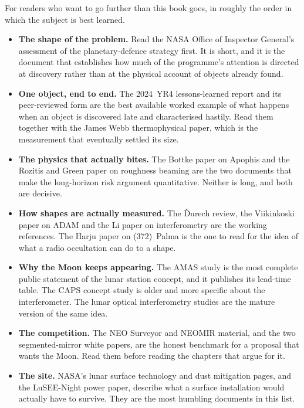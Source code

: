 \noindent\small
For readers who want to go further than this book goes, in roughly the order
in which the subject is best learned.

\begin{itemize}
\item \textbf{The shape of the problem.} Read the NASA Office of Inspector
General's assessment of the planetary-defence strategy first. It is short,
and it is the document that establishes how much of the programme's
attention is directed at discovery rather than at the physical account of
objects already found.
\item \textbf{One object, end to end.} The 2024~YR4 lessons-learned report
and its peer-reviewed form are the best available worked example of what
happens when an object is discovered late and characterised hastily. Read
them together with the James Webb thermophysical paper, which is the
measurement that eventually settled its size.
\item \textbf{The physics that actually bites.} The Bottke paper on
Apophis and the Rozitis and Green paper on roughness beaming are the two
documents that make the long-horizon risk argument quantitative. Neither is
long, and both are decisive.
\item \textbf{How shapes are actually measured.} The \v{D}urech review,
the Viikinkoski paper on ADAM and the Li paper on interferometry are the
working references. The Harju paper on (372)~Palma is the one to read for
the idea of what a radio occultation can do to a shape.
\item \textbf{Why the Moon keeps appearing.} The AMAS study is the most
complete public statement of the lunar station concept, and it publishes its
lead-time table. The CAPS concept study is older and more specific about the
interferometer. The lunar optical interferometry studies are the mature
version of the same idea.
\item \textbf{The competition.} The NEO Surveyor and NEOMIR material, and
the two segmented-mirror white papers, are the honest benchmark for a
proposal that wants the Moon. Read them before reading the chapters that
argue for it.
\item \textbf{The site.} NASA's lunar surface technology and dust mitigation
pages, and the LuSEE-Night power paper, describe what a surface installation
would actually have to survive. They are the most humbling documents in this
list.
\end{itemize}
\clearpage

